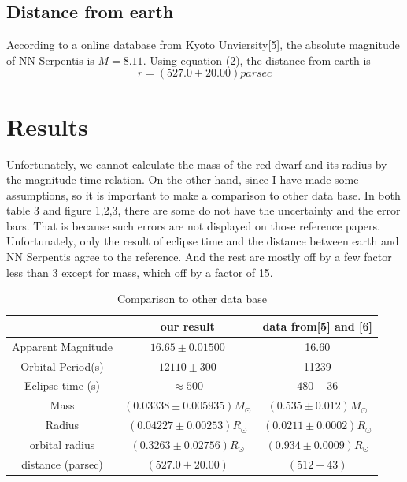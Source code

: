 \documentclass[10pt,journal,compsoc]{IEEEtran}
\begin{document}
\subsection{Distance from earth}
According to a online database from Kyoto Unviersity[5], the absolute  magnitude of NN Serpentis is $M=8.11$. Using equation (2), the distance from earth is $$r=(527.0\pm20.00)parsec$$



\section{Results}
Unfortunately, we cannot calculate the mass of the red dwarf and its radius by the magnitude-time relation. On the other hand, since I have made some assumptions, so it is important to make a comparison to other data base. In both table 3 and figure 1,2,3, there are some do not have the uncertainty and the error bars. That is because such errors are not displayed on those reference papers.
\\Unfortunately, only the result of eclipse time and the distance between earth and NN Serpentis agree to the reference. And the rest are mostly off by a few factor less than 3 except for mass, which off by a factor of 15.
\begin{table}[h!]
\centering
\caption{Comparison to other data base}
\begin{tabular}{||c c c ||} 
 \hline
 & our result & data from[5] and [6] \\ [1ex] 
 \hline\hline
 Apparent Magnitude & $ 16.65\pm0.01500 $ & 16.60\\
 Orbital Period(s) & $12110\pm300$ & 11239\\
 Eclipse time (s) & $\approx500$ & $480\pm36$ \\
 Mass & $(0.03338\pm 0.005935)M_\odot$ & $(0.535\pm0.012)M_\odot$ \\
 Radius& $(0.04227\pm0.00253)R_\odot$ & $(0.0211\pm0.0002)R_\odot$ \\
 orbital radius & $(0.3263\pm0.02756)R_\odot$ & $(0.934\pm0.0009)R_\odot$ \\
 distance (parsec) & $(527.0\pm20.00)$ & $(512\pm43)$\\
\hline\hline 
\end{tabular}
\label{table:1}
\end{table}
\end{document}
